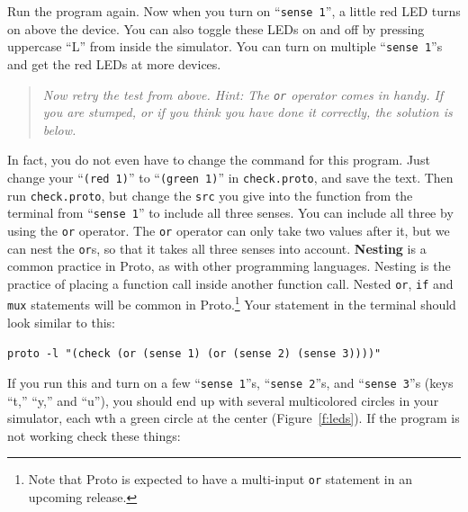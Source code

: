 \documentclass{article}
\newcommand\code[1]{\begin{center}\var{#1}\end{center}}
\newcommand\problem[1]{\begin{quote}{\em #1}\end{quote}}
\newcommand\var[1]{{\tt #1}}
\newcommand\qvar[1]{``{\tt #1}''}
\begin{document}
Run the program again. Now when you turn on \qvar{sense 1}, a little
red LED turns on above the device.  You can also toggle these LEDs on
and off by pressing uppercase ``L'' from inside the simulator.  You
can turn on multiple \qvar{sense 1}s and get the red LEDs at more
devices.

\problem{Now retry the test from above.  Hint: The \var{or} operator
  comes in handy.  If you are stumped, or if you think you have done
  it correctly, the solution is below.}

In fact, you do not even have to change the command for this program.
Just change your \qvar{(red 1)} to \qvar{(green 1)} in
\var{check.proto}, and save the text.  Then run \var{check.proto}, but
change the \var{src} you give into the function from the terminal from
\qvar{sense 1} to include all three senses.  You can include all three
by using the \var{or} operator.  The \var{or} operator can only take
two values after it, but we can nest the \var{or}s, so that it takes
all three senses into account.  {\bf Nesting} is a common practice in
Proto, as with other programming languages.  Nesting is the practice
of placing a function call inside another function call.  Nested
\var{or}, \var{if} and \var{mux} statements will be common in
Proto.\footnote{Note that Proto is expected to have a multi-input
  \var{or} statement in an upcoming release.}  Your statement in the
terminal should look similar to this:

\code{proto -l "(check (or (sense 1) (or (sense 2) (sense 3))))"}

If you run this and turn on a few \qvar{sense 1}s, \qvar{sense 2}s,
and \qvar{sense 3}s (keys ``t,'' ``y,'' and ``u''), you should end up
with several multicolored circles in your simulator, each wth a green
circle at the center (Figure~\ref{f:leds}).  If the program is not
working check these things:
\end{document}
